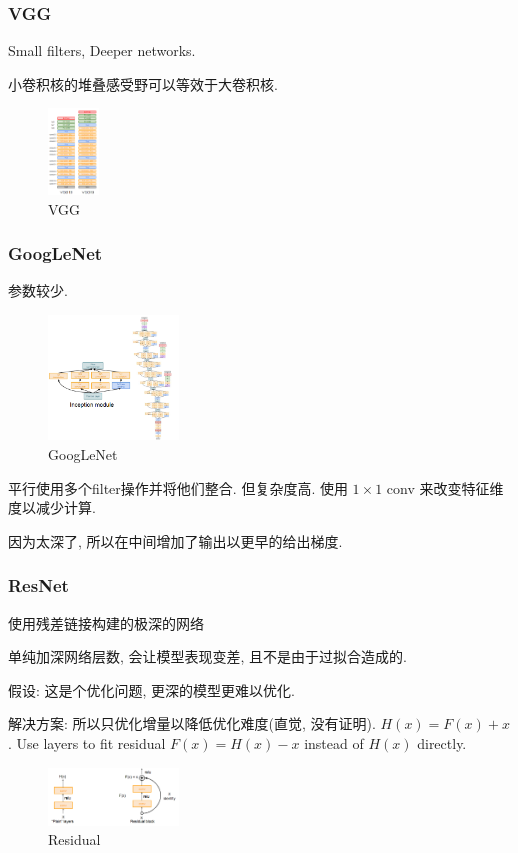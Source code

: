 \subsubsection{VGG}
Small filters, Deeper networks. 

小卷积核的堆叠感受野可以等效于大卷积核. 
\begin{figure}[!htb]
    \centering
    \includegraphics[width=0.12\textwidth]{pic/Lec9/VGG.png}
    \caption{VGG}
\end{figure}



\subsubsection{GoogLeNet}
参数较少.
\begin{figure}[!htb]
    \centering
    \includegraphics[width=0.309\textwidth]{pic/Lec9/GoogLeNet.png}
    \caption{GoogLeNet}
\end{figure}
平行使用多个filter操作并将他们整合. 但复杂度高. 使用 $1\times1$ conv 来改变特征维度以减少计算. 

因为太深了, 所以在中间增加了输出以更早的给出梯度. 


\subsubsection{ResNet}
使用残差链接构建的极深的网络


单纯加深网络层数, 会让模型表现变差, 且不是由于过拟合造成的. 

假设: 这是个优化问题, 更深的模型更难以优化. 

解决方案: 所以只优化增量以降低优化难度(直觉, 没有证明). $H(x)=F(x)+x$.  Use layers to
fit residual $F(x) = H(x) - x$ instead of $H(x)$ directly. 

\begin{figure}[!htb]
    \centering
    \includegraphics[width=0.309\textwidth]{pic/Lec9/Residual block}
    \caption{Residual}
\end{figure}


